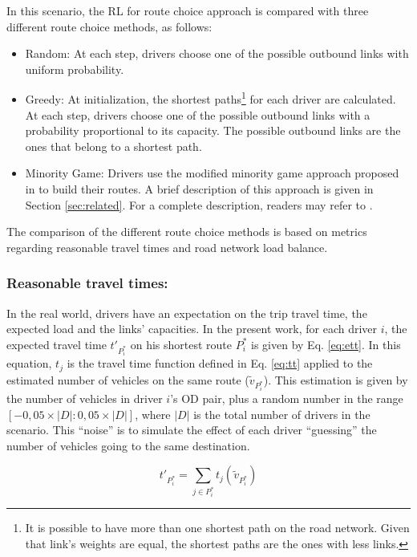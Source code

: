 \documentclass{RITA}
\newcommand{\optRoute}[1]{\ensuremath{P_#1^*}}	%
\newcommand{\travTime}{\ensuremath{t_j}} 	%
\newcommand{\veh}{\ensuremath{v}}		%
\newcommand{\ett}[1]{\ensuremath{t'_{#1}}}		%
\newcommand{\expVeh}[1]{\ensuremath{\tilde{\veh}_{\optRoute{#1}}}}		%
\begin{document}
In this scenario, the RL for route choice approach is compared with three different route choice methods, as follows:

\begin{itemize}
  \item Random: At each step, drivers choose one of the possible outbound links with uniform probability.
  \item Greedy: At initialization, the shortest paths\footnote{It is possible to have more than one shortest path on the road network. Given that link's weights are equal, the shortest paths are the ones with less links.} for each driver are calculated. At each step, drivers choose one of the possible outbound links with a probability proportional to its capacity. The possible outbound links are the ones that belong to a shortest path. %
  \item Minority Game: Drivers use the modified minority game approach proposed in \cite{Galib&Moser2011} to build their routes. A brief description of this approach is given in Section \ref{sec:related}. For a complete description, readers may refer to \cite{Galib&Moser2011}.
\end{itemize}

The comparison of the different route choice methods is based on metrics regarding reasonable travel times and road network load balance.

\subsubsection{Reasonable travel times:}
\label{sec:ttMetric}
In the real world, drivers have an expectation on the trip travel time, the expected load and the links' capacities. In the present work, for each driver $i$, the expected travel time $\ett{\optRoute{i}}$ on his shortest route $\optRoute{i}$ is given by Eq. \eqref{eq:ett}. In this equation, $\travTime$ is the travel time function defined in Eq. \eqref{eq:tt} applied to the estimated number of vehicles on the same route ($\expVeh{i}$). This estimation is given by the number of vehicles in driver $i$'s OD pair, plus a random number in the range $[-0,05 \times |D| : 0,05 \times |D|]$, where $|D|$ is the total number of drivers in the scenario. This ``noise'' is to simulate the effect of each driver ``guessing'' the number of vehicles going to the same destination.

\begin{equation}
\label{eq:ett}
\ett{\optRoute{i}} = \sum_{j \in \optRoute{i}}\travTime(\expVeh{i})
\end{equation}
\end{document}
